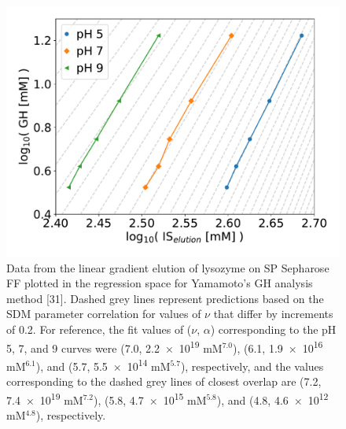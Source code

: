\documentclass[11pt,a4paper]{article}
\begin{document}
\begin{figure}[htbp]
    \centering
    \includegraphics[width=\textwidth]{figure_8}
    \caption{
    Data from the linear gradient elution of lysozyme on SP Sepharose FF plotted in the regression space for Yamamoto's GH analysis method [31]. Dashed grey lines represent predictions based on the SDM parameter correlation for values of $\nu$ that differ by increments of 0.2. For reference, the fit values of ($\nu$, $\alpha$) corresponding to the pH 5, 7, and 9 curves were (7.0, \num{2.2e+19} mM$^{7.0}$), (6.1, \num{1.9e+16} mM$^{6.1}$), and (5.7, \num{5.5e+14} mM$^{5.7}$), respectively, and the values corresponding to the dashed grey lines of closest overlap are (7.2, \num{7.4e19} mM$^{7.2}$), (5.8, \num{4.7e15} mM$^{5.8}$), and (4.8, \num{4.6e12} mM$^{4.8}$), respectively.
    }
    \label{fig:lge overlay}
\end{figure}
\end{document}
